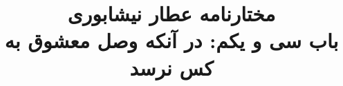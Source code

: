 \documentclass[14pt,b5paper]{article}
\begin{document}
\title{\Huge مختارنامه عطار نیشابوری \\
باب سی و یکم: در آنکه وصل معشوق به کس نرسد}
\author{ }
\date{ }
\maketitle
\newpage
\tableofcontents
\newpage

\newpage

\newpage

\newpage

\newpage

\newpage

\newpage

\newpage

\newpage

\newpage

\newpage

\newpage

\newpage

\newpage

\newpage

\newpage

\newpage

\newpage

\newpage

\newpage

\newpage

\newpage

\newpage

\newpage

\newpage

\newpage

\newpage

\newpage

\newpage

\newpage

\newpage

\newpage

\newpage

\newpage

\newpage

\newpage

\newpage

\newpage

\newpage

\newpage

\newpage

\newpage

\newpage

\newpage

\newpage

\newpage

\newpage

\newpage

\newpage

\newpage

\newpage

\newpage

\newpage

\newpage

\newpage

\newpage

\newpage

\newpage

\newpage

\newpage

\newpage

\newpage

\newpage

\newpage

\newpage

\newpage

\newpage

\newpage

\newpage

\newpage

\newpage

\newpage

\newpage

\newpage

\newpage

\newpage

\newpage

\newpage

\newpage
\end{document}
